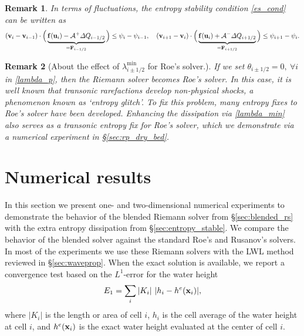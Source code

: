 \documentclass[preprint, 11pt]{article}
\newcommand{\A}{{\mathcal A}}
\newcommand{\bff}{{\bf f}}
\newcommand{\bfF}{{\bf F}}
\newcommand{\bfu}{{\bf u}}
\newcommand{\bfv}{{\bf v}}
\newcommand{\bfx}{{\bf x}}
\newtheorem{remark}{Remark}
\begin{document}
\begin{remark}
In terms of fluctuations, the entropy stability condition \eqref{es_cond} can be written as
\begin{align*}
  (\bfv_{i}-\bfv_{i-1})\cdot
  \Big(
  \underbrace{\bff(\bfu_i)-\A^+\Delta Q_{i-1/2}}_{=\bfF_{i-1/2}}\Big)\leq \psi_{i}-\psi_{i-1},
  \quad
  (\bfv_{i+1}-\bfv_i)\cdot
  \Big(\underbrace{\bff(\bfu_i)+\A^-\Delta Q_{i+1/2}}_{=\bfF_{i+1/2}}\Big)\leq \psi_{i+1}-\psi_i.
\end{align*}
\end{remark}

\begin{remark}[About the effect of $\lambda_{i\pm 1/2}^{\min}$ for Roe's solver.]
  If we set $\theta_{i\pm 1/2}=0, ~\forall i$ in \eqref{lambda_p}, then the Riemann solver becomes Roe's solver.
  In this case, it is well known that transonic rarefactions develop non-physical shocks,
  a phenomenon known as `entropy glitch'. To fix this problem, many entropy fixes to Roe's
  solver have been developed. Enhancing the dissipation via \eqref{lambda_min}
  also serves as a transonic entropy fix for Roe's solver, which we demonstrate
  via a numerical experiment in \S \ref{sec:rp_dry_bed}.
\end{remark}

\clearpage
\section{Numerical results}\label{sec:num}
In this section we present one- and two-dimensional numerical experiments to demonstrate the behavior of the
blended Riemann solver from \S\ref{sec:blended_rs} with the extra entropy dissipation from \S\ref{sec:entropy_stable}.
We compare the behavior of the blended solver against the standard Roe's and Rusanov's solvers.
In most of the experiments we use these Riemann solvers with the LWL method reviewed in \S\ref{sec:waveprop}.
When the exact solution is available, we report a convergence test based on the $L^1$-error for the water height
\begin{align*}
  E_1=\sum_i|K_i|~|h_i-h^e(\bfx_i)|,
\end{align*}
where $|K_i|$ is the length or area of cell $i$,
$h_i$ is the cell average of the water height at cell $i$,
and $h^e(\bfx_i)$ is the exact water height evaluated at the center of cell $i$.
\end{document}
